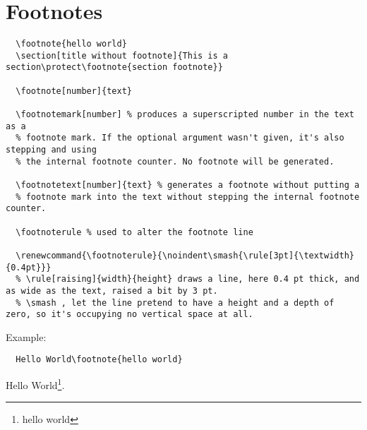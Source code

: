 \chapter{Footnotes}

\begin{lstlisting}
  \footnote{hello world}
  \section[title without footnote]{This is a section\protect\footnote{section footnote}}

  \footnote[number]{text}

  \footnotemark[number] % produces a superscripted number in the text as a
  % footnote mark. If the optional argument wasn't given, it's also stepping and using
  % the internal footnote counter. No footnote will be generated.

  \footnotetext[number]{text} % generates a footnote without putting a
  % footnote mark into the text without stepping the internal footnote counter.

  \footnoterule % used to alter the footnote line

  \renewcommand{\footnoterule}{\noindent\smash{\rule[3pt]{\textwidth}{0.4pt}}}
  % \rule[raising]{width}{height} draws a line, here 0.4 pt thick, and as wide as the text, raised a bit by 3 pt.
  % \smash , let the line pretend to have a height and a depth of zero, so it's occupying no vertical space at all.
\end{lstlisting}

Example:
\begin{lstlisting}
  Hello World\footnote{hello world}
\end{lstlisting}
\begin{tcolorbox}
Hello World\footnote{hello world}.  
\end{tcolorbox}



